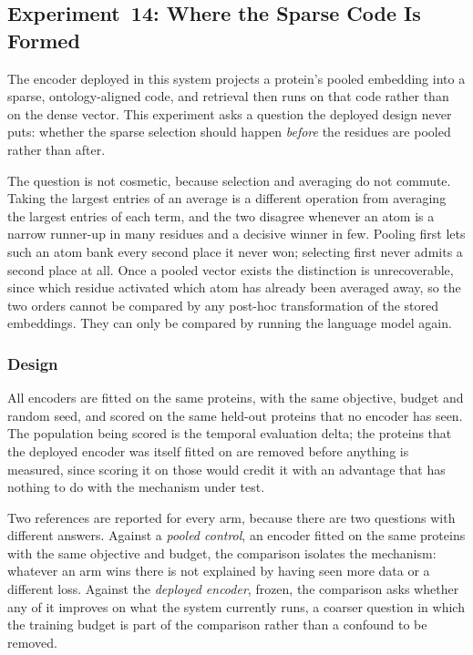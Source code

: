 \subsection{Experiment~14: Where the Sparse Code Is Formed}
\label{sec:exp14-residue-sparse}

The encoder deployed in this system projects a protein's pooled embedding into a
sparse, ontology-aligned code, and retrieval then runs on that code rather than on
the dense vector. This experiment asks a question the deployed design never puts:
whether the sparse selection should happen \emph{before} the residues are pooled
rather than after.

The question is not cosmetic, because selection and averaging do not commute. Taking
the largest entries of an average is a different operation from averaging the largest
entries of each term, and the two disagree whenever an atom is a narrow runner-up in
many residues and a decisive winner in few. Pooling first lets such an atom bank
every second place it never won; selecting first never admits a second place at all.
Once a pooled vector exists the distinction is unrecoverable, since which residue
activated which atom has already been averaged away, so the two orders cannot be
compared by any post-hoc transformation of the stored embeddings. They can only be
compared by running the language model again.

\subsubsection{Design}

All encoders are fitted on the same proteins, with the same objective, budget and
random seed, and scored on the same held-out proteins that no encoder has seen. The
population being scored is the temporal evaluation delta; the proteins that the
deployed encoder was itself fitted on are removed before anything is measured, since
scoring it on those would credit it with an advantage that has nothing to do with the
mechanism under test.

Two references are reported for every arm, because there are two questions with
different answers. Against a \emph{pooled control}, an encoder fitted on the same
proteins with the same objective and budget, the comparison isolates the mechanism:
whatever an arm wins there is not explained by having seen more data or a different
loss. Against the \emph{deployed encoder}, frozen, the comparison asks whether any of
it improves on what the system currently runs, a coarser question in which the
training budget is part of the comparison rather than a confound to be removed.

